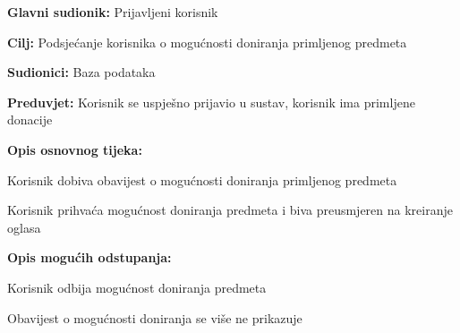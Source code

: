 					\noindent {}
					\begin{packed_item}
	
						\item \textbf{Glavni sudionik: }Prijavljeni korisnik
						\item  \textbf{Cilj:} Podsjećanje korisnika o mogućnosti doniranja primljenog predmeta
						\item  \textbf{Sudionici:} Baza podataka
						\item  \textbf{Preduvjet:} Korisnik se uspješno prijavio u sustav, korisnik ima primljene donacije
						\item  \textbf{Opis osnovnog tijeka:}
						
						\item[] \begin{packed_enum}
							\item Korisnik dobiva obavijest o mogućnosti doniranja primljenog predmeta
							\item Korisnik prihvaća mogućnost doniranja predmeta i biva preusmjeren na kreiranje oglasa
						\end{packed_enum}

						\item  \textbf{Opis mogućih odstupanja:}

						\item[] \begin{packed_item}
							\item[2.a] Korisnik odbija mogućnost doniranja predmeta
							\item[] \begin{packed_enum}
								
								\item Obavijest o mogućnosti doniranja se više ne prikazuje
							
							\end{packed_enum}	

						\end{packed_item}
						
					\end{packed_item}
					

